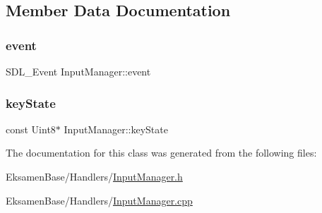 \subsection{Member Data Documentation}
\mbox{\label{class_input_manager_af4889753f2148b02fe0fba6300d283d2}} 
\subsubsection{\texorpdfstring{event}{event}}
{\footnotesize\ttfamily S\+D\+L\+\_\+\+Event Input\+Manager\+::event}

\mbox{\label{class_input_manager_ac4a1f49b858f90ecdc487157f5e43f3a}} 
\subsubsection{\texorpdfstring{key\+State}{keyState}}
{\footnotesize\ttfamily const Uint8$\ast$ Input\+Manager\+::key\+State}



The documentation for this class was generated from the following files\+:\begin{DoxyCompactItemize}
\item 
Eksamen\+Base/\+Handlers/\mbox{\hyperlink{_input_manager_8h}{Input\+Manager.\+h}}\item 
Eksamen\+Base/\+Handlers/\mbox{\hyperlink{_input_manager_8cpp}{Input\+Manager.\+cpp}}\end{DoxyCompactItemize}

